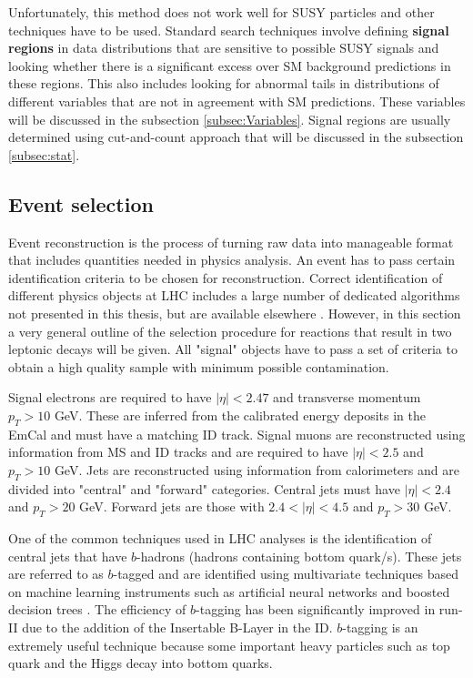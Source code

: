 Unfortunately, this method does not work well for SUSY particles and other techniques have to be used. Standard search techniques involve defining \textbf{signal regions} in data distributions that are sensitive to possible SUSY signals and looking whether there is a significant excess over SM background predictions in these regions. 
This also includes looking for abnormal tails in distributions of different variables that are not in agreement with SM predictions. These variables will be discussed in the subsection \ref{subsec:Variables}. Signal regions are usually determined using cut-and-count approach that will be discussed in the subsection \ref{subsec:stat}.

\subsection{Event selection}

Event reconstruction is the process of turning raw data into manageable format that includes quantities needed in physics analysis. An event has to pass certain identification criteria to be chosen for reconstruction. Correct identification of different physics objects at LHC includes a large number of dedicated algorithms not presented in this thesis, but are available elsewhere \citep{Aad:2016tuk}. 
However, in this section a very general outline of the selection procedure for reactions that result in two leptonic decays will be given. All "signal" objects have to pass a set of criteria to obtain a high quality sample with minimum possible contamination.

Signal electrons are required to have $|\eta|<2.47$ and transverse momentum $p_{T}>10$ GeV. These are inferred from the calibrated  energy deposits in the EmCal and must have a matching ID track. Signal muons are reconstructed using information from MS and ID tracks and are required to have   $|\eta|<2.5$ and $p_{T}>10$ GeV. Jets are reconstructed using information from calorimeters and are divided into "central" and "forward" categories. Central jets must have $|\eta|<2.4$ and $p_{T}>20$ GeV. Forward jets are those with $2.4<|\eta|<4.5$ and $p_{T}>30$ GeV. 

One of the common techniques used in LHC analyses is the identification of central jets that have $b$-hadrons (hadrons containing bottom quark/s).  These jets are referred to as $b$-tagged and are identified using multivariate techniques based on machine learning instruments such as artificial neural networks and boosted decision trees \citep{Aad:2015ydr}. The efficiency of $b$-tagging has been significantly improved in run-II due to the addition of the Insertable B-Layer in the ID. $b$-tagging is an extremely useful technique because some important heavy particles such as top quark and the Higgs decay into bottom quarks. 

